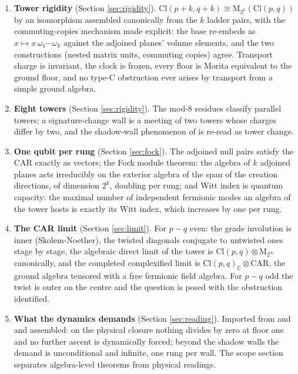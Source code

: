 \documentclass[11pt]{article}
\theoremstyle{definition}
\newcommand{\Cl}{\mathrm{Cl}}
\newcommand{\C}{\mathbb{C}}
\newcommand{\Mat}{\mathrm{M}}
\newcommand{\CAR}{\mathrm{CAR}}
\begin{document}
\begin{enumerate}
\item \textbf{Tower rigidity} (Section \ref{sec:rigidity}). $\Cl(p{+}k,q{+}k) \cong \Mat_{2^k}(\Cl(p,q))$ by an isomorphism assembled canonically from the $k$ ladder pairs, with the commuting-copies mechanism made explicit: the base re-embeds as $x \mapsto x\,\omega_1\cdots\omega_k$ against the adjoined planes' volume elements, and the two constructions (nested matrix units, commuting copies) agree. Transport charge is invariant, the clock is frozen, every floor is Morita equivalent to the ground floor, and no type-C obstruction ever arises by transport from a simple ground algebra.
\item \textbf{Eight towers} (Section \ref{sec:rigidity}). The mod-8 residues classify parallel towers; a signature-change wall is a meeting of two towers whose charges differ by two, and the shadow-wall phenomenon of \cite{ButlerT4} is re-read as tower change.
\item \textbf{One qubit per rung} (Section \ref{sec:fock}). The adjoined null pairs satisfy the CAR exactly as vectors; the Fock module theorem: the algebra of $k$ adjoined planes acts irreducibly on the exterior algebra of the span of the creation directions, of dimension $2^k$, doubling per rung; and Witt index is quantum capacity: the maximal number of independent fermionic modes an algebra of the tower hosts is exactly its Witt index, which increases by one per rung.
\item \textbf{The CAR limit} (Section \ref{sec:limit}). For $p - q$ even: the grade involution is inner (Skolem-Noether), the twisted diagonals conjugate to untwisted ones stage by stage, the algebraic direct limit of the tower is $\Cl(p,q) \otimes \Mat_{2^\infty}$ canonically, and the completed complexified limit is $\Cl(p,q)_\C \otimes \CAR$, the ground algebra tensored with a free fermionic field algebra. For $p - q$ odd the twist is outer on the centre and the question is posed with the obstruction identified.
\item \textbf{What the dynamics demands} (Section \ref{sec:reading}). Imported from \cite{ButlerT4} and \cite{ButlerT1} and assembled: on the physical closure nothing divides by zero at floor one and no further ascent is dynamically forced; beyond the shadow walls the demand is unconditional and infinite, one rung per wall. The scope section separates algebra-level theorems from physical readings.
\end{enumerate}
\end{document}
